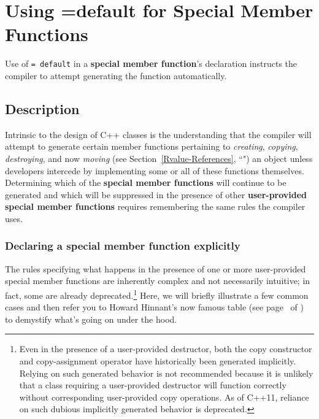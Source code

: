 \newpage
\section[Defaulted Functions]{Using {\SecCode =default} for Special Member Functions}\label{Defaulted-Special-Member-Functions}\label{defaulted-special-member-functions}


Use of \texttt{=}~\texttt{default} in a \textbf{special member function}'s
declaration instructs the compiler to attempt generating the function
automatically.

\subsection[Description]{Description}\label{description}

Intrinsic to the design of C++ classes is the understanding that the
compiler will attempt to generate certain member functions pertaining to
\emph{creating}, \emph{copying}, \emph{destroying}, and now
\emph{moving} (see Section~\ref{Rvalue-References}, ``") an object unless
developers intercede by implementing some or all of these functions
themselves. Determining which of the \textbf{special member functions}
will continue to be generated and which will be suppressed in the
presence of other \textbf{user-provided special member functions}
requires remembering the same rules the compiler uses.

\subsubsection[Declaring a special member function explicitly]{Declaring a special member function explicitly}\label{declaring-a-special-member-function-explicitly}

The rules specifying what happens in the presence of one or more
user-provided special member functions are inherently complex and not
necessarily intuitive; in fact, some are already
deprecated.{\cprotect\footnote{Even in the presence of a user-provided
destructor, both the copy constructor and copy-assignment operator
have historically been generated implicitly. Relying on such generated
behavior is not recommended because it is unlikely that a class
requiring a user-provided destructor will function correctly without
corresponding user-provided copy operations. As of C++11, reliance on
such dubious implicitly generated behavior is deprecated.}} Here, we
will briefly illustrate a few common cases and then refer you to Howard
Hinnant's now famous table (see page~\pageref{default-table1} of {\it{}}) to
demystify what's going on under the hood.

